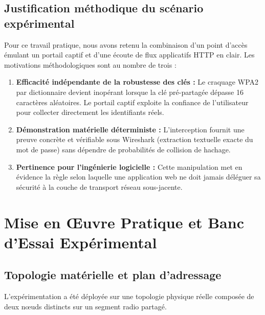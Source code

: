 \documentclass[a4paper,11pt]{article}
\begin{document}
\subsection{Justification méthodique du scénario expérimental}
Pour ce travail pratique, nous avons retenu la combinaison d'un point d'accès émulant un portail captif et d'une écoute de flux applicatifs HTTP en clair. Les motivations méthodologiques sont au nombre de trois :
\begin{enumerate}
  \item \textbf{Efficacité indépendante de la robustesse des clés :} Le craquage WPA2 par dictionnaire devient inopérant lorsque la clé pré-partagée dépasse 16 caractères aléatoires. Le portail captif exploite la confiance de l'utilisateur pour collecter directement les identifiants réels.
  \item \textbf{Démonstration matérielle déterministe :} L'interception fournit une preuve concrète et vérifiable sous Wireshark (extraction textuelle exacte du mot de passe) sans dépendre de probabilités de collision de hachage.
  \item \textbf{Pertinence pour l'ingénierie logicielle :} Cette manipulation met en évidence la règle selon laquelle une application web ne doit jamais déléguer sa sécurité à la couche de transport réseau sous-jacente.
\end{enumerate}

\section{Mise en Œuvre Pratique et Banc d'Essai Expérimental}

\subsection{Topologie matérielle et plan d'adressage}
L'expérimentation a été déployée sur une topologie physique réelle composée de deux nœuds distincts sur un segment radio partagé.
\end{document}
